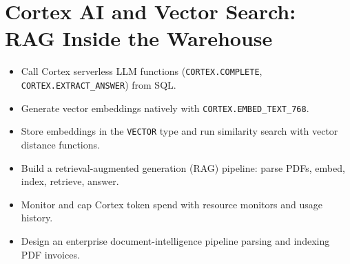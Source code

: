 \chapter{Cortex AI and Vector Search: RAG Inside the Warehouse}
%
\begin{objectives}
\begin{itemize}
    \item Call Cortex serverless LLM functions (\texttt{CORTEX.COMPLETE}, \texttt{CORTEX.EXTRACT\_ANSWER}) from SQL.
    \item Generate vector embeddings natively with \texttt{CORTEX.EMBED\_TEXT\_768}.
    \item Store embeddings in the \texttt{VECTOR} type and run similarity search with vector distance functions.
    \item Build a retrieval-augmented generation (RAG) pipeline: parse PDFs, embed, index, retrieve, answer.
    \item Monitor and cap Cortex token spend with resource monitors and usage history.
    \item Design an enterprise document-intelligence pipeline parsing and indexing PDF invoices.
\end{itemize}
\end{objectives}

